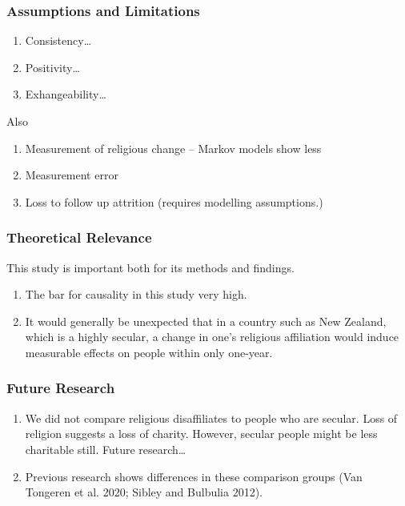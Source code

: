 \documentclass[
  letterpaper,
  DIV=11,
  numbers=noendperiod]{scrartcl}
\providecommand{\tightlist}{%
  \setlength{\itemsep}{0pt}\setlength{\parskip}{0pt}}\usepackage{longtable,booktabs,array}
\begin{document}
\hypertarget{assumptions-and-limitations}{%
\subsubsection{Assumptions and
Limitations}\label{assumptions-and-limitations}}

\begin{enumerate}
\def\labelenumi{\arabic{enumi}.}
\tightlist
\item
  Consistency\ldots{}
\item
  Positivity\ldots{}
\item
  Exhangeability\ldots{}
\end{enumerate}

Also

\begin{enumerate}
\def\labelenumi{\arabic{enumi}.}
\tightlist
\item
  Measurement of religious change -- Markov models show less
\item
  Measurement error
\item
  Loss to follow up attrition (requires modelling assumptions.)
\end{enumerate}

\hypertarget{theoretical-relevance}{%
\subsubsection{Theoretical Relevance}\label{theoretical-relevance}}

This study is important both for its methods and findings.

\begin{enumerate}
\def\labelenumi{\arabic{enumi}.}
\tightlist
\item
  The bar for causality in this study very high.
\item
  It would generally be unexpected that in a country such as New
  Zealand, which is a highly secular, a change in one's religious
  affiliation would induce measurable effects on people within only
  one-year.
\end{enumerate}

\hypertarget{future-research}{%
\subsubsection{Future Research}\label{future-research}}

\begin{enumerate}
\def\labelenumi{\arabic{enumi}.}
\tightlist
\item
  We did not compare religious disaffiliates to people who are secular.
  Loss of religion suggests a loss of charity. However, secular people
  might be less charitable still. Future research\ldots{}
\item
  Previous research shows differences in these comparison groups (Van
  Tongeren et al. 2020; Sibley and Bulbulia 2012).
\end{enumerate}
\end{document}
